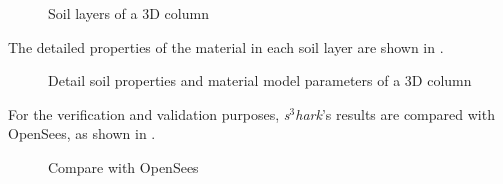\begin{figure}[!htbp]
  \caption{Soil layers of a 3D column }
  \label{fig:s3harklayers3D}
\end{figure}


The detailed properties of the material in each soil layer are shown in .

\begin{figure}[!htbp]
  \centering 
    
  \caption{Detail soil properties and material model parameters  of a 3D column}
  \label{fig:s3hark3DMatTabs}
\end{figure}




For the verification and validation purposes, \textit{s$^3$hark}'s results are compared with OpenSees, as shown in . 

\begin{figure}[!htbp]
  \caption{Compare with OpenSees}
  \label{fig:s3hark3DColumnResults}
\end{figure}
